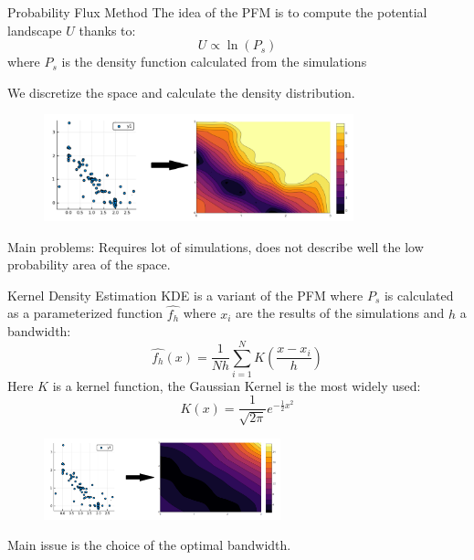 \documentclass{beamer}
\begin{document}
\begin{frame}{Probability Flux Method}
The idea of the PFM is to compute the potential landscape $U$ thanks to:
\[ U \propto \ln (P_{s}) \]
where $P_{s}$ is the density function calculated from the simulations

We discretize the space and calculate the density distribution.
\begin{figure}
\centering
\includegraphics[width=0.80\textwidth]{simtoU.png}
\end{figure}

Main problems: Requires lot of simulations, does not describe well the low probability area of the space.
\end{frame}

\begin{frame}{Kernel Density Estimation}
KDE is a variant of the PFM where $P_{s}$ is calculated as a parameterized function $\hat{f_h}$ where $x_{i}$ are the results of the simulations and $h$ a bandwidth:
\[ \hat{f_h} (x) = \frac{1}{Nh} \sum_{i=1}^{N} K\left(\frac{x-x_i}{h}\right) \] Here $K$ is a kernel function, the Gaussian Kernel is the most widely used: \[ K(x) = \frac{1}{\sqrt{2\pi}} e ^ {- \frac{1}{2} x^2} \]

\begin{figure}
\centering
\includegraphics[width=0.61\textwidth]{simtoUkde.png}
\end{figure}
Main issue is the choice of the optimal bandwidth.
\end{frame}
\end{document}
